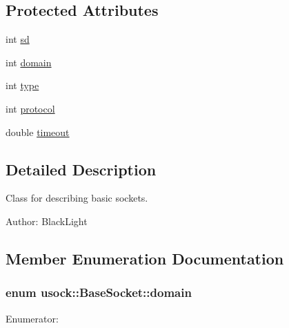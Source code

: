\subsection*{Protected Attributes}
\begin{CompactItemize}
\item 
int \hyperlink{classusock_1_1BaseSocket_63b6c07fb14f937056148cbf8b3531c5}{sd}
\item 
int \hyperlink{classusock_1_1BaseSocket_9a7414d934aeccd1340292214a2aef0e}{domain}
\item 
int \hyperlink{classusock_1_1BaseSocket_139a74d163977332762f349a73f4bd64}{type}
\item 
int \hyperlink{classusock_1_1BaseSocket_91b9f72f183b6314891f7e1f93ead99a}{protocol}
\item 
double \hyperlink{classusock_1_1BaseSocket_b419e8fd0b849c74b73a02d6bd9081e3}{timeout}
\end{CompactItemize}


\subsection{Detailed Description}
Class for describing basic sockets. 

\begin{Desc}
\item[Author:]BlackLight \end{Desc}


\subsection{Member Enumeration Documentation}
\hypertarget{classusock_1_1BaseSocket_a51cae0b366638a5f697f64174135d90}{
\subsubsection[{domain}]{\setlength{\rightskip}{0pt plus 5cm}enum {\bf usock::BaseSocket::domain}}}
\label{classusock_1_1BaseSocket_a51cae0b366638a5f697f64174135d90}


\begin{Desc}
\item[Enumerator: ]\par
\begin{description}
\item[{\em 
\hypertarget{classusock_1_1BaseSocket_a51cae0b366638a5f697f64174135d904293c75d794987e0017bab42bbbcbf73}{
inet}
\label{classusock_1_1BaseSocket_a51cae0b366638a5f697f64174135d904293c75d794987e0017bab42bbbcbf73}
}]\item[{\em 
\hypertarget{classusock_1_1BaseSocket_a51cae0b366638a5f697f64174135d9089db67cd78ea92b1ca5bf823ca967680}{
inet6}
\label{classusock_1_1BaseSocket_a51cae0b366638a5f697f64174135d9089db67cd78ea92b1ca5bf823ca967680}
}]\end{description}
\end{Desc}

